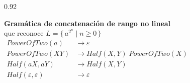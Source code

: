 \documentclass[border=12pt]{standalone}
\newcommand{\PowTwo}{\mathit{PowerOfTwo}}
\newcommand{\Half}{\mathit{Half}}
\begin{document}
\begin{varwidth}{0.92\linewidth}
\centering

{\large\bfseries Gramática de concatenación de rango no lineal}\\[2pt]
{\normalsize que reconoce $L=\{\,a^{2^n}\mid n\ge 0\,\}$}\\[14pt]

$\displaystyle
\begin{aligned}
  \PowTwo(a) &\to \varepsilon \\[4pt]
  \PowTwo(XY) &\to \Half(X,Y)\;\PowTwo(X) \\[4pt]
  \Half(aX,aY) &\to \Half(X,Y) \\[4pt]
  \Half(\varepsilon,\varepsilon) &\to \varepsilon
\end{aligned}$

\end{varwidth}
\end{document}
